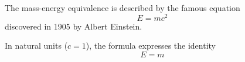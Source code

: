 \documentclass[12pt, letterpaper]{article}
\begin{document}
The mass-energy equivalence is described by the famous equation
\[ E=mc^2 \] discovered in 1905 by Albert Einstein.

In natural units ($c = 1$), the formula expresses the identity
\begin{equation}
E=m
\end{equation}
\end{document}
